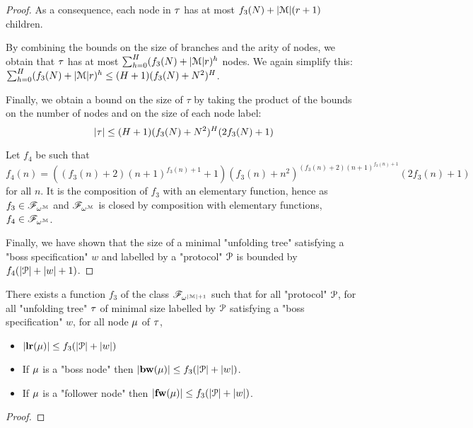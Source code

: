 \begin{proof}
	As a consequence, each node in $\tau$ has at most $f_3(N) + |\mathcal{M}|(r+1)$ children.
	
	By combining the bounds on the size of branches and the arity of nodes, we obtain that $\tau$ has at most $\sum_{h=0}^{H} (f_3(N) + |\mathcal{M}|r)^h$ nodes. We again simplify this: $\sum_{h=0}^{H} (f_3(N) + |\mathcal{M}|r)^h \leq (H+1)(f_3(N) + N^2)^H$.
	
	Finally, we obtain a bound on the size of $\tau$ by taking the product of the bounds on the number of nodes and on the size of each node label: 
	\[ |\tau| \leq  (H+1)(f_3(N) + N^2)^H (2f_3(N) +1)\]
	
	Let $f_4$ be such that $f_4(n) = ((f_3(n)+2)(n+1)^{f_3(n)+1} +1) (f_3(n) + n^2)^{(f_3(n)+2)(n+1)^{f_3(n)+1}}(2f_3(n) +1)$ for all $n$. It is the composition of $f_3$ with an elementary function, hence as $f_3 \in \mathscr{F}_{\omega^{\mathcal{M}}}$ and $\mathscr{F}_{\omega^{\mathcal{M}}}$ is closed by composition with elementary functions, $f_4 \in \mathscr{F}_{\omega^{\mathcal{M}}}$.
	
	Finally, we have shown that the size of a minimal "unfolding tree" satisfying a "boss specification" $w$ and labelled by a "protocol" $\mathcal{P}$ is bounded by $f_4(|\mathcal{P}| + |w| +1)$.
\end{proof}


\begin{lemma}
	\label{lem:bound-node-size}
	There exists a function $f_3$ of the class $\mathscr{F}_{\omega^{|\mathcal{M}|+1}}$ such that for all "protocol" $\mathcal{P}$, for all "unfolding tree" $\tau$ of minimal size labelled by $\mathcal{P}$ satisfying a "boss specification" $w$, for all node $\mu$ of $\tau$,
	
		\begin{itemize}
		\item $|\mathbf{lr}(\mu)| \leq f_3(|\mathcal{P}|+ |w|)$
			
		\item If $\mu$ is a "boss node" then $|\mathbf{bw}(\mu)| \leq f_3(|\mathcal{P}|+ |w|)$.
		
		\item If $\mu$ is a "follower node" then $|\mathbf{fw}(\mu)| \leq f_3(|\mathcal{P}|+ |w|)$.
	\end{itemize} 
\end{lemma}
\begin{proof}

\end{proof}